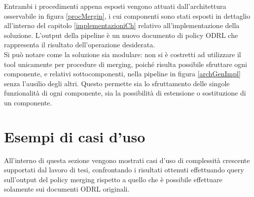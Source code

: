 \documentclass[12pt,a4paper,twoside]{book}
\begin{document}
Entrambi i procedimenti appena esposti vengono attuati dall'architettura osservabile in figura \ref{procMergin}, i cui componenti sono stati esposti in dettaglio all'interno del capitolo \ref{implementazioniCh} relativo all'implementazione della soluzione. L'output della pipeline è un nuovo documento di policy ODRL che rappresenta il risultato dell'operazione desiderata.\\
Si può notare come la soluzione sia modulare: non si è costretti ad utilizzare il tool unicamente per procedure di merging, poiché risulta possibile sfruttare ogni componente, e relativi sottocomponenti, nella pipeline in figura \ref{archGenImpl} senza l'ausilio degli altri. Questo permette sia lo sfruttamento delle singole funzionalità di ogni componente, sia la possibilità di estensione o sostituzione di un componente.\\
\section{Esempi di casi d'uso}
All'interno di questa sezione vengono mostrati casi d'uso di complessità crescente supportati dal lavoro di tesi, confrontando i risultati ottenuti effettuando query sull'output del policy merging rispetto a quello che è possibile effettuare solamente sui documenti ODRL originali.
\end{document}
